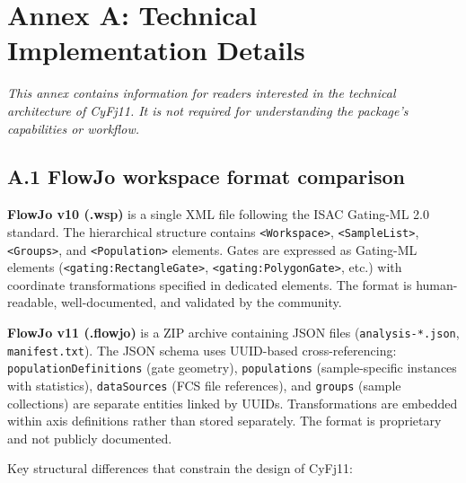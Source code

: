 \documentclass[
]{article}
\begin{document}
\newpage

\section{Annex A: Technical Implementation
Details}\label{annex-a-technical-implementation-details}

\emph{This annex contains information for readers interested in the
technical architecture of CyFj11. It is not required for understanding
the package's capabilities or workflow.}

\subsection{A.1 FlowJo workspace format
comparison}\label{a.1-flowjo-workspace-format-comparison}

\textbf{FlowJo v10 (.wsp)} is a single XML file following the ISAC
Gating-ML 2.0 standard. The hierarchical structure contains
\texttt{\textless{}Workspace\textgreater{}},
\texttt{\textless{}SampleList\textgreater{}},
\texttt{\textless{}Groups\textgreater{}}, and
\texttt{\textless{}Population\textgreater{}} elements. Gates are
expressed as Gating-ML elements
(\texttt{\textless{}gating:RectangleGate\textgreater{}},
\texttt{\textless{}gating:PolygonGate\textgreater{}}, etc.) with
coordinate transformations specified in dedicated elements. The format
is human-readable, well-documented, and validated by the community.

\textbf{FlowJo v11 (.flowjo)} is a ZIP archive containing JSON files
(\texttt{analysis-*.json}, \texttt{manifest.txt}). The JSON schema uses
UUID-based cross-referencing: \texttt{populationDefinitions} (gate
geometry), \texttt{populations} (sample-specific instances with
statistics), \texttt{dataSources} (FCS file references), and
\texttt{groups} (sample collections) are separate entities linked by
UUIDs. Transformations are embedded within axis definitions rather than
stored separately. The format is proprietary and not publicly
documented.

Key structural differences that constrain the design of CyFj11:
\end{document}

